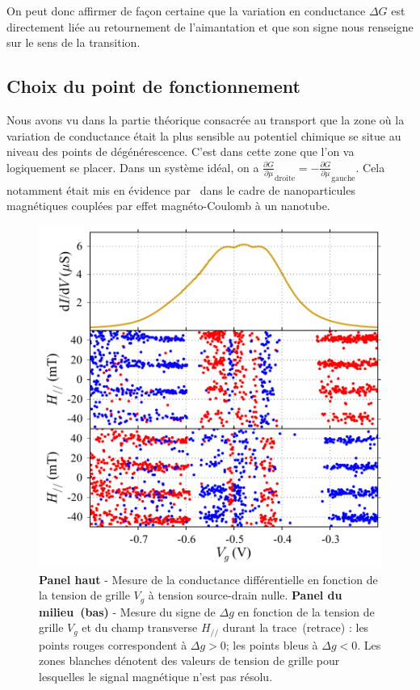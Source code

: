 On peut donc affirmer de façon certaine que la variation en conductance $\Delta G$ est directement liée au retournement de l'aimantation et que son signe nous renseigne sur le sens de la transition.

\subsection{Choix du point de fonctionnement}
Nous avons vu dans la partie théorique consacrée au transport que la zone où la variation de conductance était la plus sensible au potentiel chimique se situe au niveau des points de dégénérescence. C'est dans cette zone que l'on va logiquement se placer. Dans un système idéal, on a $\frac{\partial G}{\partial \mu}_{\text{droite}} = -\frac{\partial G}{\partial \mu}_{\text{gauche}} $. Cela notamment était mis en évidence par~\cite{Datta2011} dans le cadre de nanoparticules magnétiques couplées par effet magnéto-Coulomb à un nanotube.

\begin{figure}
\parbox{7cm}{
\includegraphics[scale=0.45]{Resultats/Chap1/Figure6/figure6.pdf} 
}
\parbox{6.5cm}{\caption{\textbf{Panel haut} - Mesure de la conductance différentielle en fonction de la tension de grille $V_g$ à tension source-drain nulle. \textbf{Panel du milieu~(bas)} - Mesure du signe de $\Delta g$ en fonction de la tension de grille $V_g$ et du champ transverse $H_{//}$ durant la trace~(retrace) : les points rouges correspondent à $\Delta g >0$; les points bleus à $\Delta g <0$. Les zones blanches dénotent des valeurs de tension de grille pour lesquelles le signal magnétique n'est pas résolu.}
\label{point_fonctio}
}
\end{figure}

